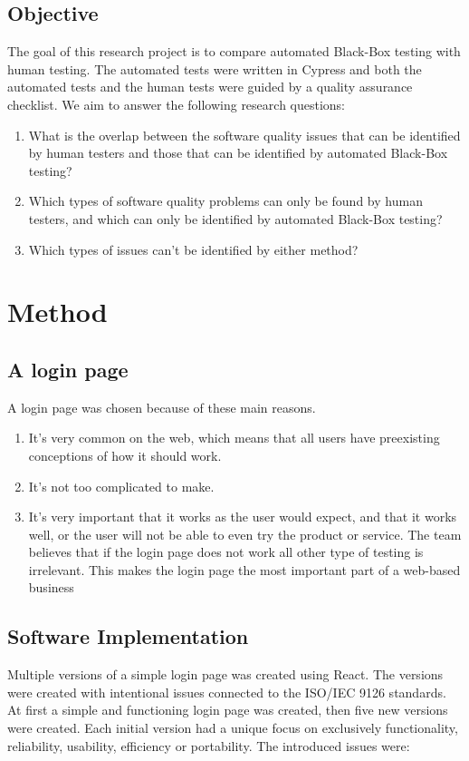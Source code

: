 \documentclass[journal,twocolumn]{IEEEtran}
\begin{document}
\subsection{Objective}
The goal of this research project is to compare automated Black-Box testing with human testing. The automated tests were written in Cypress and both the automated tests and the human tests were guided by a quality assurance checklist. We aim to answer the following research questions:
\begin{enumerate}
    \item What is the overlap between the software quality issues that can be identified by human testers and those that can be identified by automated Black-Box testing? %
    \item Which types of software quality problems can only be found by human testers, and which can only be identified by automated Black-Box testing? %
    \item Which types of issues can't be identified by either method? %
\end{enumerate}

\section{Method}
\subsection{A login page}
A login page was chosen because of these main reasons.

\begin{enumerate}
    \item It's very common on the web, which means that all users have preexisting conceptions of how it should work.
    \item It's not too complicated to make.
    \item It's very important that it works as the user would expect, and that it works well, or the user will not be able to even try the product or service. The team believes that if the login page does not work all other type of testing is irrelevant. This makes the login page the most important part of a web-based business
\end{enumerate}
\subsection{Software Implementation}
Multiple versions of a simple login page was created using React. The versions were created with intentional issues connected to the ISO/IEC 9126 standards. At first a simple and functioning login page was created, then five new versions were created. Each initial version had a unique focus on exclusively functionality, reliability, usability, efficiency or portability. The introduced issues were:
\end{document}
